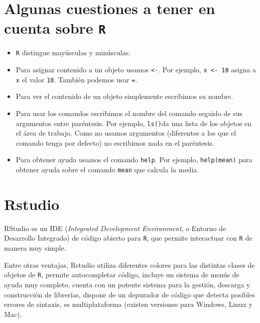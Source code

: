 \documentclass[]{book}
\begin{document}
\section{\texorpdfstring{Algunas cuestiones a tener en cuenta sobre
\texttt{R}}{Algunas cuestiones a tener en cuenta sobre R}}\label{algunas-cuestiones-a-tener-en-cuenta-sobre-r}

\begin{itemize}
\item
  \texttt{R} distingue mayúsculas y minúsculas.
\item
  Para asignar contenido a un objeto usamos \texttt{\textless{}-}. Por
  ejemplo, \texttt{x\ \textless{}-\ 10} asigna a \texttt{x} el valor
  \texttt{10}. También podemos usar \texttt{=}.
\item
  Para ver el contenido de un objeto simplemente escribimos su nombre.
\item
  Para usar los comandos escribimos el nombre del comando seguido de sus
  argumentos entre paréntesis. Por ejemplo, \texttt{ls()}da una lista de
  los objetos en el área de trabajo. Como no usamos argumentos
  (diferentes a los que el comando tenga por defecto) no escribimos nada
  en el paréntesis.
\item
  Para obtener ayuda usamos el comando \texttt{help}. Por ejemplo,
  \texttt{help(mean)} para obtener ayuda sobre el comando \texttt{mean}
  que calcula la media.
\end{itemize}

\section{Rstudio}\label{rstudio}

RStudio es un IDE (\emph{Integrated Development Environment}, o Entorno
de Desarrollo Integrado) de código abierto para \texttt{R}, que permite
interactuar con \texttt{R} de manera muy simple.

Entre otras ventajas, Rstudio utiliza diferentes colores para las
distintas clases de objetos de \texttt{R}, permite autocompletar código,
incluye un sistema de menús de ayuda muy completo, cuenta con un potente
sistema para la gestión, descarga y construcción de librerías, dispone
de un depurador de código que detecta posibles errores de sintaxis, es
multiplataforma (existen versiones para Windows, Linux y Mac).
\end{document}
